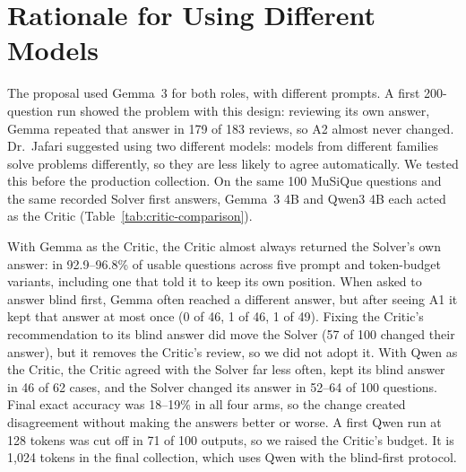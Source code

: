 \section{Rationale for Using Different Models}
\label{sec:two-models}

The proposal used Gemma~3 for both roles, with different prompts. A first
200-question run showed the problem with this design: reviewing its own
answer, Gemma repeated that answer in 179 of 183 reviews, so A2 almost never
changed. Dr.~Jafari suggested using two different models: models from
different families solve problems differently, so they are less likely to
agree automatically. We tested this before the production collection. On the same 100 MuSiQue
questions and the same recorded Solver first answers, Gemma~3 4B and Qwen3 4B
each acted as the Critic (Table~\ref{tab:critic-comparison}).

With Gemma as the Critic, the Critic almost always returned the Solver's own
answer: in 92.9--96.8\% of usable questions across five prompt and
token-budget variants, including one that told it to keep its own position.
When asked to answer blind first, Gemma often reached a different answer, but
after seeing A1 it kept that answer at most once (0 of 46, 1 of 46, 1 of 49).
Fixing the Critic's recommendation to its blind answer did move the Solver (57
of 100 changed their answer), but it removes the Critic's review, so we did
not adopt it. With Qwen as the Critic, the Critic agreed with the Solver far
less often, kept its blind answer in 46 of 62 cases, and the Solver changed
its answer in 52--64 of 100 questions. Final exact accuracy was 18--19\% in
all four arms, so the change created disagreement without making the answers
better or worse. A first Qwen run at 128 tokens was cut off in 71 of 100
outputs, so we raised the Critic's budget. It is 1,024 tokens in the final
collection, which uses Qwen with the blind-first protocol.


